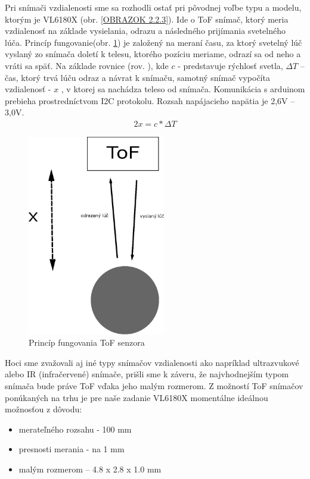 Pri snímači vzdialenosti sme sa rozhodli ostať pri pôvodnej voľbe typu a modelu, ktorým je VL6180X (obr. \ref{OBRAZOK 2.2.3}).
Ide o ToF snímač, ktorý meria vzdialenosť na základe vysielania, odrazu a následného prijímania svetelného lúča. Princíp fungovanie(obr. \ref{OBRAZOK 2.2.2}) je založený na meraní času, za ktorý svetelný lúč vyslaný zo snímača doletí k telesu, ktorého pozíciu meriame, odrazí sa od neho a vráti sa späť. Na základe rovnice (rov. ), kde  \(c\) - predstavuje rýchlosť svetla, \(\Delta T\) – čas, ktorý trvá lúču odraz a návrat k snímaču, samotný snímač vypočíta vzdialenosť - \(x\) , v ktorej sa nachádza teleso od snímača. Komunikácia s arduinom prebieha prostredníctvom I2C protokolu. Rozsah napájacieho napätia je 2,6V – 3,0V. 
\begin{align}
	\label{rovnica.2.1}
	2x = c*\Delta T
\end{align}
\begin{figure}[!h]
	\centering
	\includegraphics[width=60mm]{obr/ToF.eps}
	\caption{Princíp fungovania ToF senzora}\label{OBRAZOK 2.2.2} 
\end{figure} 

Hoci sme zvažovali aj iné typy snímačov vzdialenosti ako napríklad ultrazvukové alebo IR (infračervené) snímače, prišli sme k záveru, že najvhodnejším typom snímača bude práve ToF vďaka jeho malým rozmerom. Z možností ToF snímačov ponúkaných na trhu je pre naše zadanie VL6180X momentálne ideálnou možnosťou z dôvodu:
\begin{itemize}
	\item merateľného rozsahu - 100 mm
	\item presnosti merania - na 1 mm 
	\item malým rozmerom – 4.8 x 2.8 x 1.0 mm \cite{VL6180X}
\end{itemize}


